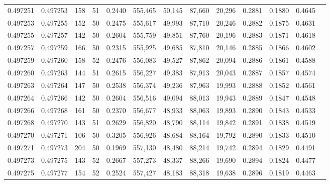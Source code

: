 \begin{tabular}{rrrrrrrrrrrrr}
0.497251 & 0.497253 &   158 &  51 &                                     0.2440 & 555,465 &  50,145 &  87,660 &  20,296 & 0.2881 & 0.1880 & 0.4645 \\
0.497253 & 0.497255 &   152 &  50 &                                     0.2475 & 555,617 &  49,993 &  87,710 &  20,246 & 0.2882 & 0.1875 & 0.4631 \\
0.497255 & 0.497257 &   142 &  50 &                                     0.2604 & 555,759 &  49,851 &  87,760 &  20,196 & 0.2883 & 0.1871 & 0.4618 \\
0.497257 & 0.497259 &   166 &  50 &                                     0.2315 & 555,925 &  49,685 &  87,810 &  20,146 & 0.2885 & 0.1866 & 0.4602 \\
0.497259 & 0.497260 &   158 &  52 &                                     0.2476 & 556,083 &  49,527 &  87,862 &  20,094 & 0.2886 & 0.1861 & 0.4588 \\
0.497260 & 0.497263 &   144 &  51 &                                     0.2615 & 556,227 &  49,383 &  87,913 &  20,043 & 0.2887 & 0.1857 & 0.4574 \\
0.497263 & 0.497264 &   147 &  50 &                                     0.2538 & 556,374 &  49,236 &  87,963 &  19,993 & 0.2888 & 0.1852 & 0.4561 \\
0.497264 & 0.497266 &   142 &  50 &                                     0.2604 & 556,516 &  49,094 &  88,013 &  19,943 & 0.2889 & 0.1847 & 0.4548 \\
0.497266 & 0.497268 &   161 &  50 &                                     0.2370 & 556,677 &  48,933 &  88,063 &  19,893 & 0.2890 & 0.1843 & 0.4533 \\
0.497268 & 0.497270 &   143 &  51 &                                     0.2629 & 556,820 &  48,790 &  88,114 &  19,842 & 0.2891 & 0.1838 & 0.4519 \\
0.497270 & 0.497271 &   106 &  50 &                                     0.3205 & 556,926 &  48,684 &  88,164 &  19,792 & 0.2890 & 0.1833 & 0.4510 \\
0.497271 & 0.497273 &   204 &  50 &                                     0.1969 & 557,130 &  48,480 &  88,214 &  19,742 & 0.2894 & 0.1829 & 0.4491 \\
0.497273 & 0.497275 &   143 &  52 &                                     0.2667 & 557,273 &  48,337 &  88,266 &  19,690 & 0.2894 & 0.1824 & 0.4477 \\
0.497275 & 0.497277 &   154 &  52 &                                     0.2524 & 557,427 &  48,183 &  88,318 &  19,638 & 0.2896 & 0.1819 & 0.4463 \\

\end{tabular}

